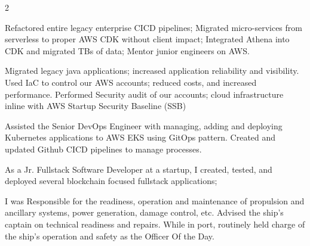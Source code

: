 \documentclass[10pt,a4paper,ragged2e,withhyper]{altacv}
\begin{document}
\begin{paracol}{2}

\begin{itemize}
Refactored entire legacy enterprise CICD pipelines; Migrated micro-services from
serverless to proper AWS CDK without client impact;
Integrated Athena into CDK and migrated TBs of data; Mentor junior engineers on AWS.

\end{itemize}

\divider

\begin{itemize}
Migrated legacy java applications; increased application reliability and
visibility. Used IaC to control our AWS accounts; reduced costs, and increased
performance. Performed Security audit of our accounts; cloud infrastructure
inline with AWS Startup Security Baseline (SSB)
\end{itemize}

\divider

\begin{itemize}
Assisted the Senior DevOps Engineer with managing, adding and deploying
Kubernetes applications to AWS EKS using GitOps pattern. Created and updated
Github CICD pipelines to manage processes.
\end{itemize}

\divider

\begin{itemize}
As a Jr. Fullstack Software Developer at a startup, I created, tested, and
deployed several blockchain focused fullstack applications;
\end{itemize}


\divider

\begin{itemize}
I was Responsible for the readiness, operation and maintenance of propulsion
and ancillary systems, power generation, damage control, etc.
Advised the ship's captain on technical
readiness and repairs. While in port, routinely held charge of the ship's
operation and safety as the Officer Of the Day.
\end{itemize}


\end{paracol}
\end{document}
